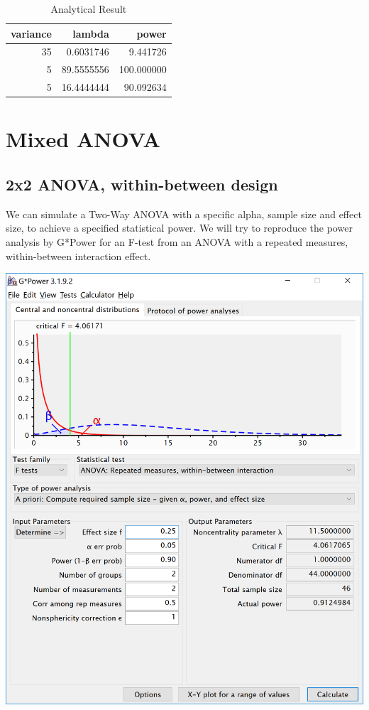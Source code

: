\documentclass[]{book}
\begin{document}
\begin{table}[!h]

\caption{\label{tab:unnamed-chunk-170}Analytical Result}
\centering
\begin{tabular}{r|r|r}
\hline
variance & lambda & power\\
\hline
35 & 0.6031746 & 9.441726\\
\hline
5 & 89.5555556 & 100.000000\\
\hline
5 & 16.4444444 & 90.092634\\
\hline
\end{tabular}
\end{table}

\hypertarget{mixed-anova}{%
\chapter{Mixed ANOVA}\label{mixed-anova}}

\hypertarget{x2-anova-within-between-design}{%
\section{2x2 ANOVA, within-between design}\label{x2-anova-within-between-design}}

We can simulate a Two-Way ANOVA with a specific alpha, sample size and effect size, to achieve a specified statistical power. We will try to reproduce the power analysis by G*Power for an F-test from an ANOVA with a repeated measures, within-between interaction effect.

\includegraphics{screenshots/gpower_5.png}
\end{document}
